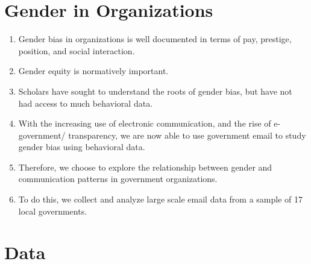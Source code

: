 \documentclass[fleqn]{MJDArticle}
\begin{document}

\section{Gender in Organizations}

\begin{enumerate}
	\item Gender bias in organizations is well documented in terms of pay, prestige, position, and social interaction. 
	\item Gender equity is normatively important.
	\item Scholars have sought to understand the roots of gender bias, but have not had access to much behavioral data.
	\item With the increasing use of electronic communication, and the rise of e-government/ transparency, we are now able to use government email to study gender bias using behavioral data.
	\item Therefore, we choose to explore the relationship between gender and communication patterns in government organizations.  
	\item To do this, we collect and analyze large scale email data from a sample of 17 local governments.  
\end{enumerate}

\section{Data}
\end{document}
